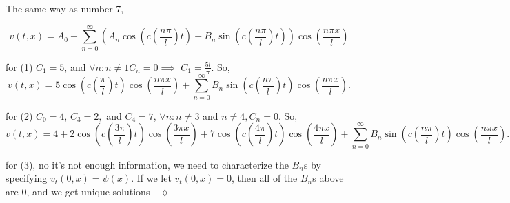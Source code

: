 \documentclass{article}
\begin{document}
The same way as number 7,

\[v(t,x) = A_0 +\sum_{n=0}^\infty \left(
    A_n\cos\left(c\left(  \frac{ n\pi
        }{l}\right)t\right) + B_n\sin\left(c\left(  \frac{n\pi}{l}\right) t\right) \right)\cos\left( \frac{n\pi x}{l}
  \right)\]

for (1) $C_1 = 5$, and $\forall n: n\neq 1 C_n = 0 \implies$
$C_1 = \frac{5l}{\pi}$. So,
\[v(t,x) = 5\cos\left(c\left(
      \frac{\pi}{l}\right)t \right)\cos\left(\frac{n\pi x}{l}
  \right) + \sum_{n=0}^\infty  B_n\sin\left(c\left(  \frac{n\pi}{l}\right) t\right) \cos\left( \frac{n\pi x}{l}
  \right) .\]

for (2) $C_0 = 4$, $C_3 = 2,$ and $C_4 = 7$, $\forall n: n\neq 3$ and
$n\neq 4, C_n = 0$. So,
\[v(t,x) = 4 + 2\cos\left(c\left(
      \frac{3\pi}{l}\right)t \right)\cos\left( \frac{3\pi x}{l}
  \right) + 7\cos\left(c\left(
      \frac{4\pi}{l}\right)t \right)\cos\left( \frac{4 \pi x}{l}
  \right) + \sum_{n=0}^\infty  B_n\sin\left(c\left(  \frac{n\pi}{l}\right) t\right) \cos\left( \frac{n\pi x}{l}
  \right).\]

for (3), no it's not enough information, we need to characterize the
$B_n$s by specifying $v_t(0,x) = \psi(x)$. If we let $v_t(0,x) = 0$,
then all of the $B_n$s above are $0$, and we get unique
solutions$\quad \lozenge$
\end{document}
